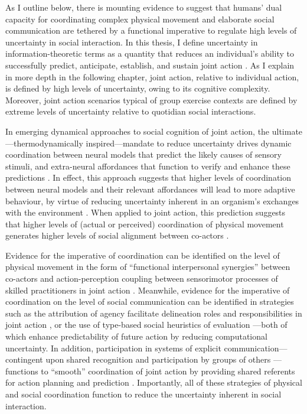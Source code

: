 \begin{CJK}{UTF8}{gbsn}
As I outline below, there is mounting evidence to suggest that humans' dual capacity for coordinating complex physical movement and elaborate social communication are tethered by a functional imperative to regulate high levels of uncertainty in social interaction.  In this thesis, I define uncertainty in information-theoretic terms as a quantity that reduces an individual's ability to successfully predict, anticipate, establish, and sustain joint action \citep{Shannon1963}.  As I explain in more depth in the following chapter, joint action, relative to individual action, is defined by high levels of uncertainty, owing to its cognitive complexity.  Moreover, joint action scenarios typical of group exercise contexts are defined by extreme levels of uncertainty relative to quotidian social interactions.

In emerging dynamical approaches to social cognition of joint action, the ultimate---thermodynamically inspired---mandate to reduce uncertainty drives dynamic coordination between neural models that predict the likely causes of sensory stimuli,  and extra-neural affordances that function to verify and enhance these predictions \citep{Friston2015,Ramstead2016}.  In effect, this approach suggests that higher levels of coordination between neural models and their relevant affordances will lead to more adaptive behaviour, by virtue of reducing uncertainty inherent in an organism's exchanges with the environment \citep{Friston2010,Ramstead2017}.  When applied to joint action, this prediction suggests that higher levels of (actual or perceived) coordination of physical movement generates higher levels of social alignment between co-actors \citep[]{Semin2008,Wheatley2012}.

Evidence for the imperative of coordination can be identified on the level of physical movement in the form of ``functional interpersonal synergies'' \citep{Riley2011} between co-actors and action-perception coupling between sensorimotor processes of skilled practitioners in joint action \citep{Novembre2014}.  Meanwhile, evidence for the imperative of coordination on the level of social communication can be identified in strategies such as the attribution of agency facilitate delineation roles and responsibilities in joint action \citep{Wolpert2003,Sato2008,VanderWel2012}, or the use of type-based social heuristics of evaluation \citep[e.g., personality type or social standing; see][]{Moutoussis2014}---both of which enhance predictability of future action by reducing computational uncertainty.
In addition, participation in systems of explicit communication---contingent upon shared recognition and participation by groups of others \citep{Ramstead2016}---functions to ``smooth'' coordination of joint action by providing shared referents for action planning and prediction \citep{Vesper2017}.
Importantly, all of these strategies of physical and social coordination function to reduce the uncertainty inherent in social interaction.


\end{CJK}
